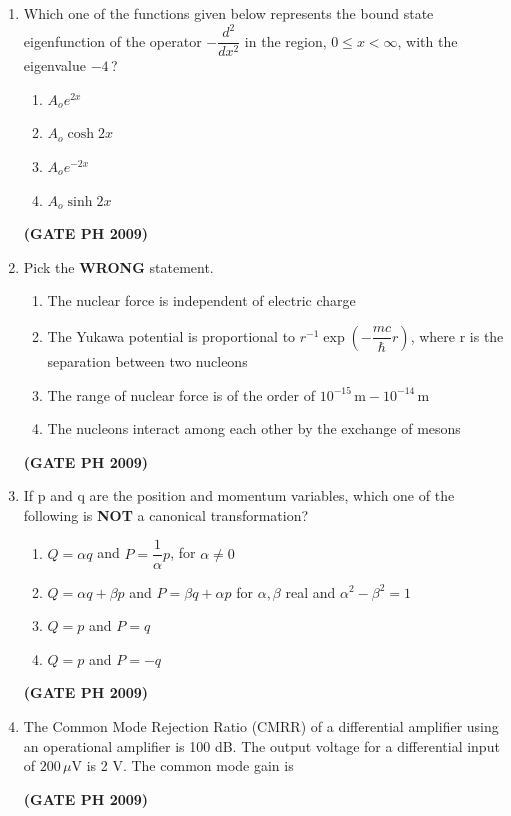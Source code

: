 \documentclass[14pt, a4paper]{extarticle}
\begin{document}
\begin{enumerate}[label=\textbf{Q. \arabic*}]
\item Which one of the functions given below represents the bound state eigenfunction of the operator $-\dfrac{d^2}{dx^2}$ in the region, $0 \le x < \infty$, with the eigenvalue $-4$\,?
    \begin{multicols}{2}
    \begin{enumerate}
        \item $A_o e^{2x}$
        \item $A_o \cosh 2x$
        \item $A_o e^{-2x}$
        \item $A_o \sinh 2x$
    \end{enumerate}
    \end{multicols}
    \hfill \textbf{(GATE PH 2009)}

\item Pick the \textbf{WRONG} statement.
    \begin{enumerate}
        \item The nuclear force is independent of electric charge
        \item The Yukawa potential is proportional to $r^{-1} \exp\left(-\dfrac{mc}{\hbar} r\right)$, where r is the separation between two nucleons
        \item The range of nuclear force is of the order of $10^{-15}\,\mathrm{m} - 10^{-14}\,\mathrm{m}$
        \item The nucleons interact among each other by the exchange of mesons
    \end{enumerate}
    \hfill \textbf{(GATE PH 2009)}

\item If p and q are the position and momentum variables, which one of the following is \textbf{NOT} a canonical transformation?
    \begin{enumerate}
        \item $Q = \alpha q$ and $P = \dfrac{1}{\alpha}p$, for $\alpha \neq 0$
        \item $Q = \alpha q + \beta p$ and $P = \beta q + \alpha p$ for $\alpha, \beta$ real and $\alpha^2 - \beta^2 = 1$
        \item $Q = p$ and $P = q$
        \item $Q = p$ and $P = -q$
    \end{enumerate}
    \hfill \textbf{(GATE PH 2009)}

\item The Common Mode Rejection Ratio (CMRR) of a differential amplifier using an operational amplifier is 100 dB.
The output voltage for a differential input of $200\,\mu\text{V}$ is 2 V. The common mode gain is
\begin{enumerate}
\end{enumerate}
\hfill \textbf{(GATE PH 2009)}


\end{enumerate}
\end{document}
